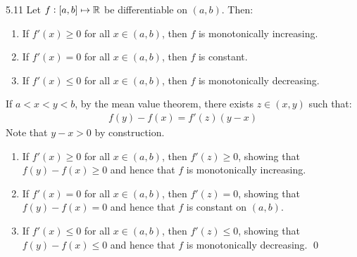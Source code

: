 \begin{theorem}{}{5.11}
    Let $f: [a, b] \mapsto \mathbb{R}$ be differentiable on $(a, b)$. Then:
    \begin{enumerate}
        \item If $f'(x) \geq 0$ for all $x \in (a, b)$, then $f$ is monotonically increasing.
        \item If $f'(x) = 0$ for all $x \in (a, b)$, then $f$ is constant. 
        \item If $f'(x) \leq 0$ for all $x \in (a, b)$, then $f$ is monotonically decreasing.
    \end{enumerate} 
\end{theorem}
\begin{nproof}
    If $a < x < y < b$, by the mean value theorem, there exists $z \in (x, y)$ such that:
    \begin{align*}
        f(y) - f(x) = f'(z)(y - x)
    \end{align*}
    Note that $y - x > 0$ by construction. 
    \begin{enumerate}
        \item If $f'(x) \geq 0$ for all $x \in (a, b)$, then $f'(z) \geq 0$, showing that $f(y) - f(x) \geq 0$ and hence that $f$ is monotonically increasing. 
        \item If $f'(x) = 0$ for all $x \in (a, b)$, then $f'(z) = 0$, showing that $f(y) - f(x) = 0$ and hence that $f$ is constant on $(a, b)$.
        \item If $f'(x) \leq 0$ for all $x \in (a, b)$, then $f'(z) \leq 0$, showing that $f(y) - f(x) \leq 0$ and hence that $f$ is monotonically decreasing. \qed
    \end{enumerate}
\end{nproof}

